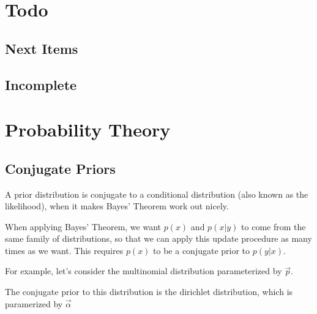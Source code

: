 \documentclass[12pt]{article}
\begin{document}
\maketitle

\tableofcontents

\newpage

\section{Todo}

\subsection{Next Items}

\subsection{Incomplete}
  
\section{Probability Theory}

\subsection{Conjugate Priors}

A prior distribution is conjugate to a conditional distribution (also known as the likelihood), when it makes Bayes' Theorem work out nicely.


When applying Bayes' Theorem, we want $p(x)$ and $p(x|y)$ to come from the same family of distributions, so that we can apply this update procedure as many times as we want. This requires $p(x)$ to be a conjugate prior to $p(y|x)$.

For example, let's consider the multinomial distribution parameterized by $\vec p$.


The conjugate prior to this distribution is the dirichlet distribution, which is paramerized by $\vec \alpha$
\end{document}
